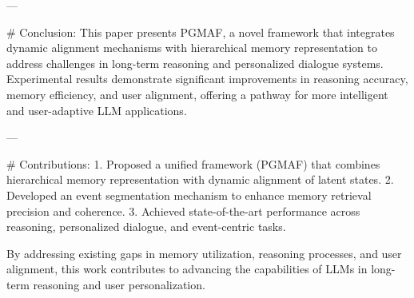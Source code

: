 ---

# Conclusion:
This paper presents PGMAF, a novel framework that integrates dynamic alignment mechanisms with hierarchical memory representation to address challenges in long-term reasoning and personalized dialogue systems. Experimental results demonstrate significant improvements in reasoning accuracy, memory efficiency, and user alignment, offering a pathway for more intelligent and user-adaptive LLM applications.

---

# Contributions:
1. Proposed a unified framework (PGMAF) that combines hierarchical memory representation with dynamic alignment of latent states.
2. Developed an event segmentation mechanism to enhance memory retrieval precision and coherence.
3. Achieved state-of-the-art performance across reasoning, personalized dialogue, and event-centric tasks.

By addressing existing gaps in memory utilization, reasoning processes, and user alignment, this work contributes to advancing the capabilities of LLMs in long-term reasoning and user personalization.